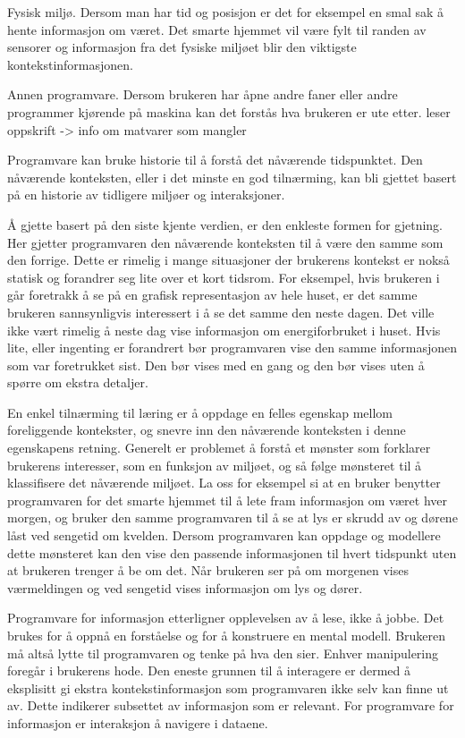 Fysisk miljø. Dersom man har tid og posisjon er det for eksempel en smal sak å hente informasjon om været. Det smarte hjemmet vil være fylt til randen av sensorer og informasjon fra det fysiske miljøet blir den viktigste kontekstinformasjonen.

Annen programvare. Dersom brukeren har åpne andre faner eller andre programmer kjørende på maskina kan det forstås hva brukeren er ute etter. {\color{red}leser oppskrift -> info om matvarer som mangler}

Programvare kan bruke historie til å forstå det nåværende tidspunktet. Den nåværende konteksten, eller i det minste en god tilnærming, kan bli gjettet basert på en historie av tidligere miljøer og interaksjoner.

Å gjette basert på den siste kjente verdien, er den enkleste formen for gjetning. Her gjetter programvaren den nåværende konteksten til å være den samme som den forrige. Dette er rimelig i mange situasjoner der brukerens kontekst er nokså statisk og forandrer seg lite over et kort tidsrom. For eksempel, hvis brukeren i går foretrakk å se på en grafisk representasjon av hele huset, er det samme brukeren sannsynligvis interessert i å se det samme den neste dagen. Det ville ikke vært rimelig å neste dag vise informasjon om energiforbruket i huset. Hvis lite, eller ingenting er forandrert bør programvaren vise den samme informasjonen som var foretrukket sist. Den bør vises med en gang og den bør vises uten å spørre om ekstra detaljer.

En enkel tilnærming til læring er å oppdage en felles egenskap mellom foreliggende kontekster, og snevre inn den nåværende konteksten i denne egenskapens retning. Generelt er problemet å forstå et mønster som forklarer brukerens interesser, som en funksjon av miljøet, og så følge mønsteret til å klassifisere det nåværende miljøet. La oss for eksempel si at en bruker benytter programvaren for det smarte hjemmet til å lete fram informasjon om været hver morgen, og bruker den samme programvaren til å se at lys er skrudd av og dørene låst ved sengetid om kvelden. Dersom programvaren kan oppdage og modellere dette mønsteret kan den vise den passende informasjonen til hvert tidspunkt uten at brukeren trenger å be om det. Når brukeren ser på om morgenen vises værmeldingen og ved sengetid vises informasjon om lys og dører.

Programvare for informasjon etterligner opplevelsen av å lese, ikke å jobbe. Det brukes for å oppnå en forståelse og for å konstruere en mental modell. Brukeren må altså lytte til programvaren og tenke på hva den sier. Enhver manipulering foregår i brukerens hode. Den eneste grunnen til å interagere er dermed å eksplisitt gi ekstra kontekstinformasjon som programvaren ikke selv kan finne ut av. Dette indikerer subsettet av informasjon som er relevant. For programvare for informasjon er interaksjon å navigere i dataene.

